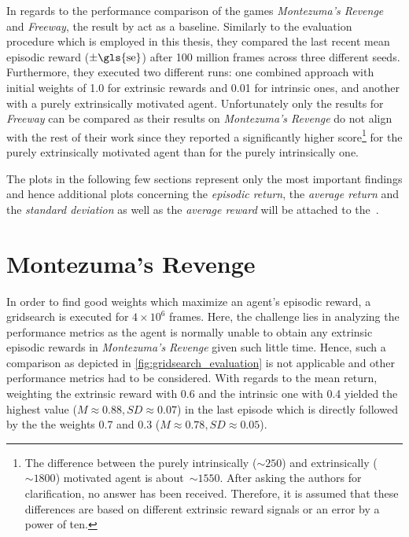 \documentclass[draft,final]{vutinfth} %
\begin{document}
    In regards to the performance comparison of the games \textit{Montezuma's Revenge} and \textit{Freeway}, the result by \citet[see Table 2]{burda_large-scale_2018-1} act as a baseline.
    Similarly to the evaluation procedure which is employed in this thesis, they compared the last recent mean episodic reward ($\pm\text{\gls{se}}$) after 100 million frames across three different seeds.
    Furthermore, they executed two different runs: one combined approach with initial weights of 1.0 for extrinsic rewards and 0.01 for intrinsic ones, and another with a purely extrinsically motivated agent.
    Unfortunately only the results for \textit{Freeway} can be compared as their results on \textit{Montezuma's Revenge} do not align with the rest of their work since they reported a significantly higher score\footnote{The difference between the purely intrinsically ($\sim250$) and extrinsically ($\sim1800$) motivated agent is about~$\sim1550$. After asking the authors \citet{burda_large-scale_2018-1} for clarification, no answer has been received. Therefore, it is assumed that these differences are based on different extrinsic reward signals or an error by a power of ten.} for the purely extrinsically motivated agent than for the purely intrinsically one.

    The plots in the following few sections represent only the most important findings and hence additional plots concerning the \textit{episodic return}, the \textit{average return} and the \textit{standard deviation} as well as the \textit{average reward} will be attached to the~.


    \section{Montezuma's Revenge}

    In order to find good weights which maximize an agent's episodic reward, a gridsearch is executed for $4 \times 10^6$ frames.
    Here, the challenge lies in analyzing the performance metrics as the agent is normally unable to obtain any extrinsic episodic rewards in \textit{Montezuma's Revenge} given such little time.
    Hence, such a comparison as depicted in \autoref{fig:gridsearch_evaluation} is not applicable and other performance metrics had to be considered.
    With regards to the mean return, weighting the extrinsic reward with 0.6 and the intrinsic one with 0.4 yielded the highest value ($M\approx0.88,SD\approx0.07$) in the last episode which is directly followed by the the weights 0.7 and 0.3 ($M\approx0.78,SD\approx0.05$).
\end{document}

